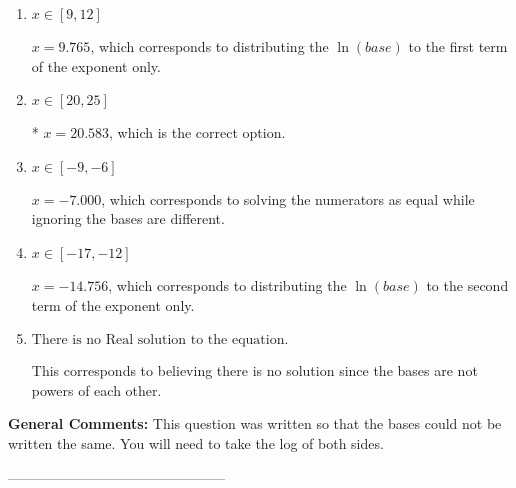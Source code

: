 \documentclass{extbook}[14pt]
\begin{document}
\begin{enumerate}[label=\Alph*.] 
\item $ x \in [9, 12] $ 

 $x = 9.765$, which corresponds to distributing the $\ln(base)$ to the first term of the exponent only. 
\item $ x \in [20, 25] $ 

 * $x = 20.583$, which is the correct option. 
\item $ x \in [-9, -6] $ 

 $x = -7.000$, which corresponds to solving the numerators as equal while ignoring the bases are different. 
\item $ x \in [-17, -12] $ 

 $x = -14.756$, which corresponds to distributing the $\ln(base)$ to the second term of the exponent only. 
\item $ \text{There is no Real solution to the equation.} $ 

 This corresponds to believing there is no solution since the bases are not powers of each other. 
\end{enumerate} 
 
\textbf{General Comments:} This question was written so that the bases could not be written the same. You will need to take the log of both sides.

-----------------------------------------------
\end{document}
